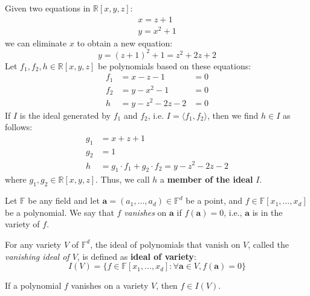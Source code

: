 \begin{Example}
Given two equations in $\mathbb{R}[x,y,z]$:
\begin{eqnarray}
x=z+1 \nonumber \\
y=x^2+1 \nonumber 
\end{eqnarray}
we can eliminate $x$ to obtain a new equation:
\begin{equation}
y=(z+1)^2+1=z^2+2z+2 \nonumber 
\end{equation}
Let $f_1, f_2, h \in \mathbb{R}[x,y,z]$ be polynomials based on these 
equations:
\begin{eqnarray}
f_1 &= x-z-1 &= 0 \nonumber \\
f_2 &= y-x^2-1 &= 0 \nonumber \\
h   &= y-z^2-2z-2 &= 0 \nonumber
\end{eqnarray}
If $I$ is the ideal generated by $f_1$ and $f_2$, i.e. 
$I=\langle f_1, f_2 \rangle$, then we find $h \in I$ as follows:
\begin{eqnarray}
g_1 &= x+z+1 \nonumber \\
g_2 &= 1     \nonumber \\
h &= g_1\cdot f_1+g_2\cdot f_2  = y-z^2-2z-2 \nonumber
\end{eqnarray}
where $g_1, g_2 \in \mathbb{R}[x,y,z]$.
Thus, we call $h$ a {\bf member of the ideal} $I$.
\end{Example}


Let $\mathbb{F}$ be any field and let $\mathbf{a}=(a_{1},\dots,a_{d}) \in \mathbb{F}^d$ be a point, and $f \in
\mathbb{F}[x_1,\dots, x_d]$ be a polynomial. We say that $f$ {\it vanishes} on $\mathbf{a}$ if $f(\mathbf{a}) = 0$, i.e.,
$\mathbf{a}$ is in the variety of $f$.

\begin{Definition}
For any variety $V$ of $\mathbb{F}^d$, the ideal of polynomials that vanish on $V$,
called the {\it vanishing ideal of $V$}, is defined as {\bf ideal of variety}:
$$I(V) = \{f\in
\mathbb{F}[x_1,\dots, x_d]: \forall \mathbf{a} \in V, f(\mathbf{a}) =
0\}$$ 
\end{Definition}

\begin{Proposition}\label{pro:iofv}
	If a polynomial $f$ vanishes on a variety $V$, then $f \in I(V)$. 
\end{Proposition}

